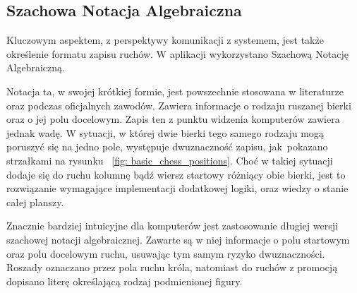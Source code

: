 \subsection{Szachowa Notacja Algebraiczna}
\label{subsec:notacja-algebraiczna}

Kluczowym aspektem, z perspektywy komunikacji z systemem, jest także określenie formatu zapisu ruchów.
W aplikacji wykorzystano Szachową Notację Algebraiczną.

Notacja ta, w swojej krótkiej formie, jest powszechnie stosowana w literaturze oraz podczas oficjalnych zawodów.
Zawiera informacje o rodzaju ruszanej bierki oraz o jej polu docelowym.
Zapis ten z punktu widzenia komputerów zawiera jednak wadę.
W sytuacji, w której dwie bierki tego samego rodzaju mogą poruszyć się na jedno pole, występuje dwuznaczność zapisu, jak~pokazano strzałkami na rysunku ~\ref{fig: basic_chess_positions}.
Choć w takiej sytuacji dodaje się do ruchu kolumnę bądź wiersz startowy różniący obie bierki, jest to rozwiązanie wymagające implementacji dodatkowej logiki, oraz wiedzy o stanie całej planszy.

Znacznie bardziej intuicyjne dla komputerów jest zastosowanie długiej wersji szachowej notacji algebraicznej.
Zawarte są w niej informacje o polu startowym oraz polu docelowym ruchu, usuwając tym samym ryzyko dwuznaczności.
Roszady oznaczano przez pola ruchu króla, natomiast do ruchów z promocją dopisano literę określającą rodzaj podmienionej figury.

